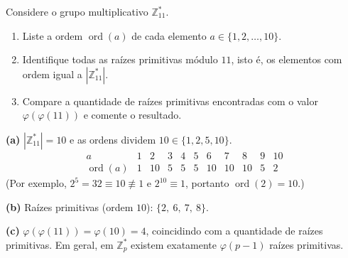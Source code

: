 \documentclass[12pt,a4paper]{article}
\begin{document}
\begin{exercicio}
Considere o grupo multiplicativo $\mathbb{Z}_{11}^{*}$.
\begin{enumerate}[label=(\alph*)]
    \item Liste a ordem $\operatorname{ord}(a)$ de cada elemento $a \in \{1, 2, \ldots, 10\}$.
    \item Identifique todas as ra\'{i}zes primitivas m\'{o}dulo $11$, isto \'{e}, os elementos com ordem igual a $|\mathbb{Z}_{11}^{*}|$.
    \item Compare a quantidade de ra\'{i}zes primitivas encontradas com o valor $\varphi(\varphi(11))$ e comente o resultado.
\end{enumerate}

\begin{resposta}
\textbf{(a)} $|\mathbb{Z}_{11}^{*}| = 10$ e as ordens dividem $10 \in \{1, 2, 5, 10\}$.
\[
\begin{array}{c|cccccccccc}
a & 1 & 2 & 3 & 4 & 5 & 6 & 7 & 8 & 9 & 10 \\ \hline
\operatorname{ord}(a) & 1 & 10 & 5 & 5 & 5 & 10 & 10 & 10 & 5 & 2
\end{array}
\]
(Por exemplo, $2^5 = 32 \equiv 10 \not\equiv 1$ e $2^{10} \equiv 1$, portanto $\operatorname{ord}(2) = 10$.)

\textbf{(b)} Ra\'{i}zes primitivas (ordem $10$): $\{2,\ 6,\ 7,\ 8\}$.

\textbf{(c)} $\varphi(\varphi(11)) = \varphi(10) = 4$, coincidindo com a quantidade de ra\'{i}zes primitivas. Em geral, em $\mathbb{Z}_p^{*}$ existem exatamente $\varphi(p-1)$ ra\'{i}zes primitivas.
\end{resposta}
\end{exercicio}
\end{document}
